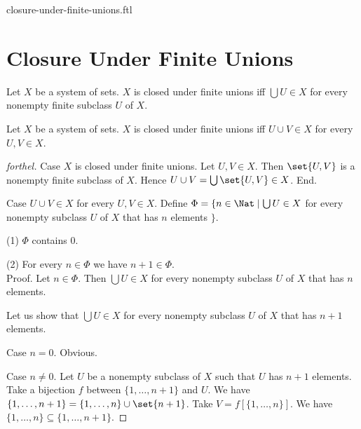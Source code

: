 \documentclass{naproche-library}
\begin{document}
\begin{smodule}{closure-under-finite-unions.ftl}

  \section*{Closure Under Finite Unions}

  \begin{definition}[forthel,id=FOUNDATIONS_14_7040118193913856,printid]
    Let $X$ be a system of sets.
    $X$ is closed under finite unions iff $\bigcup U \in X$ for every nonempty finite subclass $U$ of $X$.
  \end{definition}

  \begin{proposition}[forthel,id=FOUNDATIONS_17_4164024962908160,printid]
    Let $X$ be a system of sets.
    $X$ is closed under finite unions iff $U \cup V \in X$ for every $U, V \in X$.
  \end{proposition}
  \begin{proof}[forthel]
    Case $X$ is closed under finite unions.
      Let $U, V \in X$.
      Then $\set{U, V}$ is a nonempty finite subclass of $X$.
      Hence $U \cup V = \bigcup \set{U, V} \in X$.
    End.

    Case $U \cup V \in X$ for every $U, V \in X$.
      Define $\Phi = \{ n \in \Nat \mid \bigcup U \in X$ for every nonempty subclass $U$ of $X$ that has $n$ elements $\}$.

      (1) $\Phi$ contains $0$.

      (2) For every $n \in \Phi$ we have $n + 1 \in \Phi$. \\
      Proof.
        Let $n \in \Phi$.
        Then $\bigcup U \in X$ for every nonempty subclass $U$ of $X$ that has $n$ elements.

        Let us show that $\bigcup U \in X$ for every nonempty subclass $U$ of $X$ that has $n + 1$ elements.

          Case $n = 0$. Obvious.

          Case $n \neq 0$.
            Let $U$ be a nonempty subclass of $X$ such that $U$ has $n + 1$ elements.
            Take a bijection $f$ between $\{1, \dots, n + 1 \}$ and $U$.
            We have $\{ 1, \dots, n + 1 \} = \{ 1, \dots, n \} \cup \set{n + 1}$.
            Take $V = f[\{ 1, \dots, n \}]$.
            We have $\{ 1, \dots, n \} \subseteq \{ 1, \dots, n + 1 \}$.


\end{proof}
\end{smodule}
\end{document}
